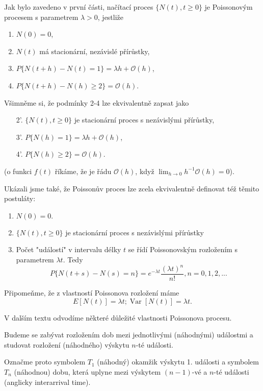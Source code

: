 \documentclass[10pt]{article}
\DeclareMathOperator*{\var}{Var}
\begin{document}
Jak bylo zavedeno v první části, načítací proces $\{N(t), t \geq 0\}$ je Poissonovým procesem s parametrem $\lambda>0$, jestliže
\begin{enumerate}
\item $N(0)=0$,
\item $N(t)$ má stacionární, nezávislé přírůstky,
\item $P\{N(t+h)-N(t)=1\} = \lambda h + \mathcal{O}(h)$,
\item $P\{N(t+h)-N(h)\geq 2 \} = \mathcal{O}(h)$.
\end{enumerate}
Všimněme si, že podmínky 2-4 lze ekvivalentně zapsat jako
\begin{enumerate}
\item[2'.] $\{N(t), t \geq 0\}$ je stacionární proces s nezávislými přírůstky,
\item[3'.] $P\{N(h)=1\} = \lambda h + \mathcal{O}(h)$,
\item[4'.] $P\{N(h)\geq 2 \} = \mathcal{O}(h)$.
\end{enumerate}
(o funkci $f(t)$ říkáme, že je řádu $\mathcal{O}(h)$, když $\lim_{h \to 0} h^{-1} \mathcal{O}(h) = 0$).

Ukázali jsme také, že Poissonův proces lze zcela ekvivalentně definovat též těmito postuláty:

\begin{enumerate}
\item $N(0)=0.$
\item $\{N(t), t \geq 0\}$ je stacionární proces s nezávislými přírůstky
\item Počet "událostí" v intervalu délky $t$ se řídí Poissonovským rozložením s parametrem $\lambda t$. Tedy $$P\{N(t+s)-N(s)=n\}=e^{-\lambda t} \frac{(\lambda t)^n}{n!}, n=0,1,2,...$$
\end{enumerate}

Připomeňme, že z vlastností Poissonova rozložení máme
\begin{equation}
E[N(t)] = \lambda t; \var[N(t)] = \lambda t.
\end{equation}

V dalším textu odvodíme některé důležité vlastnosti Poissonova procesu.

Budeme se zabývat rozložením dob mezi jednotlivými (náhodnými) událostmi a studovat rozložení (náhodného) výskytu $n$-té události.

Označme proto symbolem $T_1$ (náhodný) okamžik výskytu 1. události a symbolem $T_n$ (náhodnou) dobu, která uplyne mezi výskytem $(n-1)$-vé a $n$-té události (anglicky interarrival time).
\end{document}
